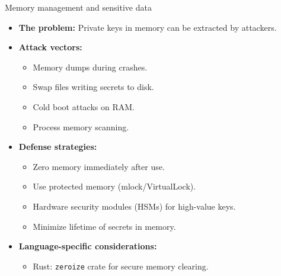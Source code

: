 \documentclass[aspectratio=169, lualatex, handout]{beamer}
\begin{document}
\begin{frame}{Memory management and sensitive data}
	\begin{itemize}
		\item \textbf{The problem:} Private keys in memory can be extracted by attackers.
		\item \textbf{Attack vectors:}
		      \begin{itemize}
			      \item Memory dumps during crashes.
			      \item Swap files writing secrets to disk.
			      \item Cold boot attacks on RAM.
			      \item Process memory scanning.
		      \end{itemize}
		\item \textbf{Defense strategies:}
		      \begin{itemize}
			      \item Zero memory immediately after use.
			      \item Use protected memory (mlock/VirtualLock).
			      \item Hardware security modules (HSMs) for high-value keys.
			      \item Minimize lifetime of secrets in memory.
		      \end{itemize}
		\item \textbf{Language-specific considerations:}
		      \begin{itemize}
			      \item Rust: \texttt{zeroize} crate for secure memory clearing.
		      \end{itemize}
	\end{itemize}
\end{frame}
\end{document}

